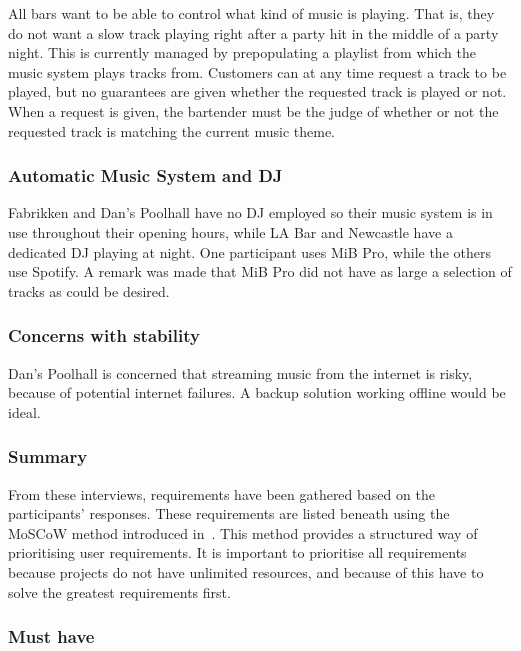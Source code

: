 All bars want to be able to control what kind of music is playing. That is, they do not want a slow track playing right after a party hit in the middle of a party night. This is currently managed by prepopulating a playlist from which the music system plays tracks from. Customers can at any time request a track to be played, but no guarantees are given whether the requested track is played or not. When a request is given, the bartender must be the judge of whether or not the requested track is matching the current music theme.

\subsubsection{Automatic Music System and DJ}
\label{sub:differences}
Fabrikken and Dan's Poolhall have no DJ employed so their music system is in use throughout their opening hours, while LA Bar and Newcastle have a dedicated DJ playing at night. One participant uses MiB Pro, while the others use Spotify. A remark was made that MiB Pro did not have as large a selection of tracks as could be desired.

\subsubsection{Concerns with stability}
\label{sub:specific_remarks}

Dan's Poolhall is concerned that streaming music from the internet is risky, because of potential internet failures. A backup solution working offline would be ideal.

\subsubsection{Summary}
\label{sub:summary}

From these interviews, requirements have been gathered based on the participants' responses. These requirements are listed beneath using the MoSCoW method introduced in~\cite{benyon2013designing}. This method provides a structured way of prioritising user requirements. It is important to prioritise all requirements because projects do not have unlimited resources, and because of this have to solve the greatest requirements first.

\subsubsection{Must have}

